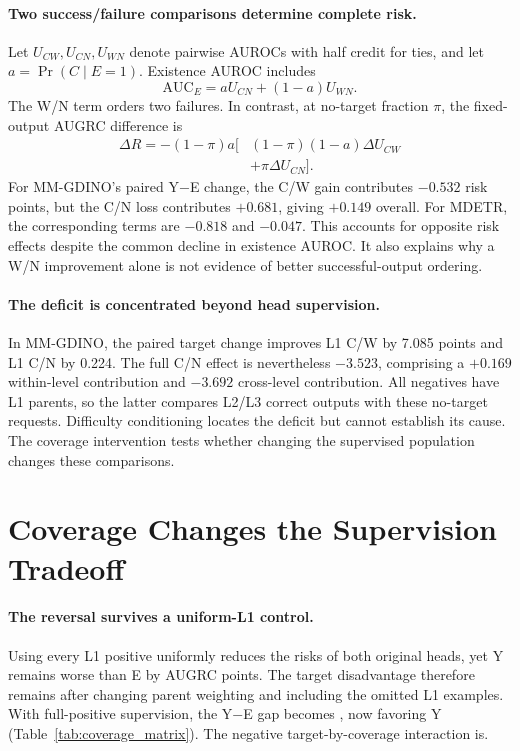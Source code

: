 \documentclass[10pt,twocolumn,letterpaper]{article}
\begin{document}
\paragraph{Two success/failure comparisons determine complete risk.}
Let $U_{CW},U_{CN},U_{WN}$ denote pairwise AUROCs with half credit for ties,
and let $a=\Pr(C\mid E=1)$. Existence AUROC includes
\begin{equation}
\mathrm{AUC}_E=aU_{CN}+(1-a)U_{WN}.
\end{equation}
The W/N term orders two failures. In contrast, at no-target fraction $\pi$,
the fixed-output AUGRC difference is
\begin{align}
\Delta R=-(1-\pi)a\big[&(1-\pi)(1-a)\Delta U_{CW}\nonumber\\
 &+\pi\Delta U_{CN}\big].\label{eq:risk}
\end{align}
For MM-GDINO's paired Y$-$E change, the C/W gain contributes $-0.532$
risk points, but the C/N loss contributes $+0.681$, giving $+0.149$ overall.
For MDETR, the corresponding terms are $-0.818$ and $-0.047$.
This accounts for opposite risk effects despite the common decline in
existence AUROC. It also explains why a W/N improvement alone is not
evidence of better successful-output ordering.

\paragraph{The deficit is concentrated beyond head supervision.}
In MM-GDINO, the paired target change improves L1 C/W by 7.085 points and
L1 C/N by 0.224. The full C/N effect is nevertheless $-3.523$, comprising a
$+0.169$ within-level contribution and $-3.692$ cross-level contribution.
All negatives have L1 parents, so the latter compares L2/L3 correct outputs
with these no-target requests. Difficulty conditioning locates the deficit
but cannot establish its cause. The coverage intervention tests whether
changing the supervised population changes these comparisons.

\section{Coverage Changes the Supervision Tradeoff}

\paragraph{The reversal survives a uniform-L1 control.}
Using every L1 positive uniformly reduces the risks of both original heads,
yet Y remains worse than E by\CovFCLoneGap{} AUGRC points.
The target disadvantage therefore remains after changing parent weighting
and including the omitted L1 examples. With full-positive supervision, the
Y$-$E gap becomes \CovFCFullGap{}, now favoring Y (Table~\ref{tab:coverage_matrix}).
The negative target-by-coverage interaction is\CovFCI{}.
\end{document}
